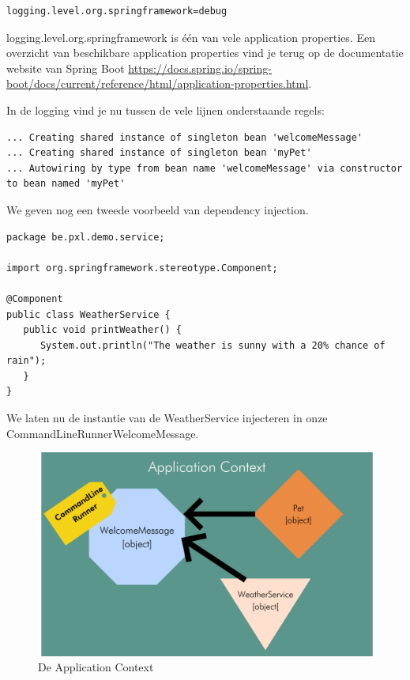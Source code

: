 \begin{lstlisting}
logging.level.org.springframework=debug
\end{lstlisting}

logging.level.org.springframework is \'e\'en van vele application properties.  Een overzicht van beschikbare application properties vind je terug op de documentatie website van Spring Boot \url{https://docs.spring.io/spring-boot/docs/current/reference/html/application-properties.html}.

In de logging vind je nu tussen de vele lijnen onderstaande regels:

\begin{small}
\begin{verbatim}
... Creating shared instance of singleton bean 'welcomeMessage'
... Creating shared instance of singleton bean 'myPet'
... Autowiring by type from bean name 'welcomeMessage' via constructor to bean named 'myPet'
\end{verbatim}
\end{small}

We geven nog een tweede voorbeeld van dependency injection.

\begin{lstlisting}
package be.pxl.demo.service;

import org.springframework.stereotype.Component;

@Component
public class WeatherService {
   public void printWeather() {
      System.out.println("The weather is sunny with a 20% chance of rain");
   }
}
\end{lstlisting}

We laten nu de instantie van de WeatherService injecteren in onze CommandLineRunnerWelcomeMessage.


\begin{figure}[H]
  \includegraphics[width=\linewidth]{images/chapter1/ac_pet_service.png}
  \caption{De Application Context}
  \label{fig:application_context}
\end{figure}

